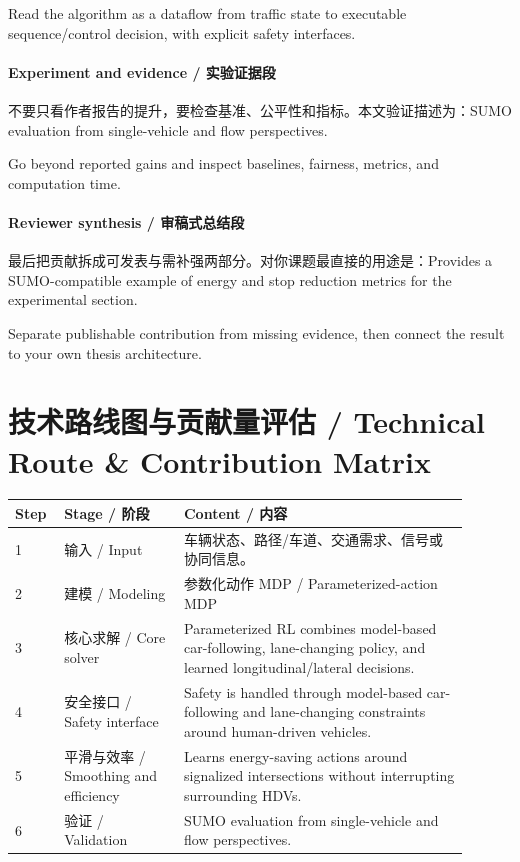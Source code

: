 \documentclass[UTF8,a4paper,11pt,fontset=fandol]{ctexart}
\begin{document}
Read the algorithm as a dataflow from traffic state to executable sequence/control decision, with explicit safety interfaces.

\paragraph{Experiment and evidence / 实验证据段}不要只看作者报告的提升，要检查基准、公平性和指标。本文验证描述为：SUMO evaluation from single-vehicle and flow perspectives.

Go beyond reported gains and inspect baselines, fairness, metrics, and computation time.

\paragraph{Reviewer synthesis / 审稿式总结段}最后把贡献拆成可发表与需补强两部分。对你课题最直接的用途是：Provides a SUMO-compatible example of energy and stop reduction metrics for the experimental section.

Separate publishable contribution from missing evidence, then connect the result to your own thesis architecture.


\section{技术路线图与贡献量评估 / Technical Route \& Contribution Matrix}
\begin{longtable}{p{0.08\linewidth}p{0.24\linewidth}p{0.58\linewidth}}
\toprule
Step & Stage / 阶段 & Content / 内容\\
\midrule
1 & 输入 / Input & 车辆状态、路径/车道、交通需求、信号或协同信息。 \\
2 & 建模 / Modeling & 参数化动作 MDP / Parameterized-action MDP \\
3 & 核心求解 / Core solver & Parameterized RL combines model-based car-following, lane-changing policy, and learned longitudinal/lateral decisions. \\
4 & 安全接口 / Safety interface & Safety is handled through model-based car-following and lane-changing constraints around human-driven vehicles. \\
5 & 平滑与效率 / Smoothing and efficiency & Learns energy-saving actions around signalized intersections without interrupting surrounding HDVs. \\
6 & 验证 / Validation & SUMO evaluation from single-vehicle and flow perspectives. \\
\bottomrule
\end{longtable}
\end{document}
